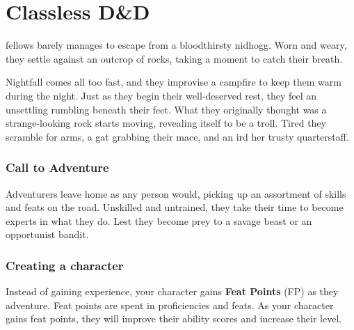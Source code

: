 \chapter{Classless D\&D} \label{ch::classlessdnd}
fellows barely manages to escape from a bloodthirsty nidhogg.
Worn and weary, they settle against an outcrop of rocks, taking a moment to catch their breath.

Nightfall comes all too fast, and they improvise a campfire to keep them warm during the night.
Just as they begin their well-deserved rest, they feel an unsettling rumbling beneath their feet.
What they originally thought was a strange-looking rock starts moving, revealing itself to be a troll.
Tired they scramble for arms, a gat grabbing their mace, and an ird her trusty quarterstaff.

\subsection*{Call to Adventure}
    Adventurers leave home as any person would, picking up an assortment of skills and feats on the road.
    Unskilled and untrained, they take their time to become experts in what they do.
    Lest they become prey to a savage beast or an opportunist bandit.

\subsection*{Creating a character}
    Instead of gaining experience, your character gains \textbf{Feat Points} (FP) as they adventure.
    Feat points are spent in proficiencies and feats.
    As your character gains feat points, they will improve their ability scores and increase their level.

